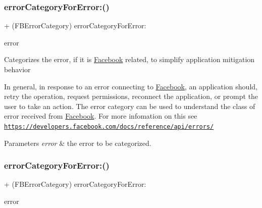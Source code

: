 \subsubsection{\texorpdfstring{error\+Category\+For\+Error\+:()}{errorCategoryForError:()}\hspace{0.1cm}{\footnotesize\ttfamily [1/5]}}
{\footnotesize\ttfamily + (F\+B\+Error\+Category) error\+Category\+For\+Error\+: \begin{DoxyParamCaption}\item[{(N\+S\+Error $\ast$)}]{error }\end{DoxyParamCaption}}

Categorizes the error, if it is \hyperlink{interfaceFacebook}{Facebook} related, to simplify application mitigation behavior

In general, in response to an error connecting to \hyperlink{interfaceFacebook}{Facebook}, an application should, retry the operation, request permissions, reconnect the application, or prompt the user to take an action. The error category can be used to understand the class of error received from \hyperlink{interfaceFacebook}{Facebook}. For more infomation on this see \href{https://developers.facebook.com/docs/reference/api/errors/}{\tt https\+://developers.\+facebook.\+com/docs/reference/api/errors/}


\begin{DoxyParams}{Parameters}
{\em error} & the error to be categorized. \\
\hline
\end{DoxyParams}
\mbox{\label{interfaceFBErrorUtility_a708ac3cac2c06d5f9432a45e4ad67082}} 
\subsubsection{\texorpdfstring{error\+Category\+For\+Error\+:()}{errorCategoryForError:()}\hspace{0.1cm}{\footnotesize\ttfamily [2/5]}}
{\footnotesize\ttfamily + (F\+B\+Error\+Category) error\+Category\+For\+Error\+: \begin{DoxyParamCaption}\item[{(N\+S\+Error $\ast$)}]{error }\end{DoxyParamCaption}}

